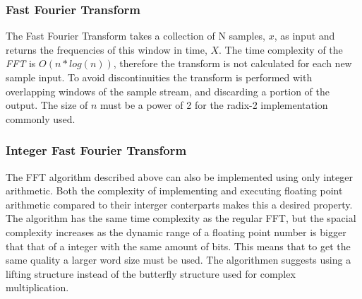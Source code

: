%
%			


\subsubsection{Fast Fourier Transform}\label{appendix:FFT}
The Fast Fourier Transform takes a collection of N samples, $x$, as input
and returns the frequencies of this window in time, $X$.
The time complexity of the {\it FFT} is $O(n*log(n))$, therefore the transform is not 
calculated for each new sample input. To avoid discontinuities the transform is performed 
with overlapping windows of the sample stream, and discarding a portion of the output.
The size of $n$ must be a power of 2 for the radix-2 implementation commonly used.


\subsubsection{Integer Fast Fourier Transform} \label{appendix:IntFFT}
The FFT algorithm described above can also be implemented using only integer 
arithmetic. Both the complexity of implementing and executing floating point
arithmetic compared to their interger conterparts makes this a desired property.
The algorithm has the same time complexity as the regular FFT, but the spacial 
complexity increases as the dynamic range of a floating point number is bigger
that that of a integer with the same amount of bits. This means that to get
the same quality a larger word size must be used. The algorithmen suggests 
using a lifting structure instead of the butterfly structure used for complex
multiplication.

